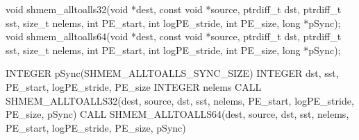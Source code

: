 
\begin{apidefinition}

\begin{Csynopsis}
void shmem_alltoalls32(void *dest, const void *source, ptrdiff_t dst, ptrdiff_t sst, size_t nelems, int PE_start, int logPE_stride, int PE_size, long *pSync);
void shmem_alltoalls64(void *dest, const void *source, ptrdiff_t dst, ptrdiff_t sst, size_t nelems, int PE_start, int logPE_stride, int PE_size, long *pSync);
\end{Csynopsis}

\begin{Fsynopsis}
INTEGER pSync(SHMEM_ALLTOALLS_SYNC_SIZE)
INTEGER dst, sst, PE_start, logPE_stride, PE_size
INTEGER nelems 
CALL SHMEM_ALLTOALLS32(dest, source, dst, sst, nelems, PE_start, logPE_stride, PE_size, pSync)
CALL SHMEM_ALLTOALLS64(dest, source, dst, sst, nelems, PE_start, logPE_stride, PE_size, pSync)
\end{Fsynopsis}

\begin{apiarguments}


\end{apiarguments}
\end{apidefinition}
